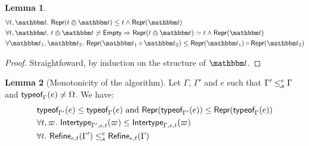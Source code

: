 \documentclass[a4paper]{article}
\theoremstyle{definition}
\newtheorem{lemma}{Lemma}
\begin{document}
  \begin{lemma}
    \begin{align*}
      &\forall t,\ts.\ \tsrep{t\tsand\ts} \leq t \land \tsrep{\ts}\\
      &\forall t,\ts.\ t\tsand\ts \not\simeq \Empty \Rightarrow \tsrep{t\tsand\ts} \simeq t \land \tsrep{\ts}\\
      &\forall \ts_1,\ts_2.\ \tsrep{\apply {\ts_1}{\ts_2}} \leq \apply {\tsrep {\ts_1}}{\tsrep {\ts_2}}
    \end{align*}
  \end{lemma}

  \begin{proof}
    Straightfoward, by induction on the structure of $\ts$.
  \end{proof}

  \begin{lemma}[Monotonicity of the algorithm] Let $\Gamma$, $\Gamma'$ and $e$ such that $\Gamma'\leq_{\!\scriptscriptstyle\mathcal{A}}^e \Gamma$ and $\textsf{typeof}_{\Gamma}(e) \neq \Omega$. We have:
    \begin{align*}
      &\textsf{typeof}_{\Gamma'}(e) \leq \textsf{typeof}_{\Gamma}(e) \text{ and } \textsf{Repr}(\textsf{typeof}_{\Gamma'}(e)) \leq \textsf{Repr}(\textsf{typeof}_{\Gamma}(e))\\
      &\forall t,\varpi.\ \textsf{Intertype}_{\Gamma',e,t} (\varpi) \leq \textsf{Intertype}_{\Gamma,e,t} (\varpi)\\
      &\forall t.\ \textsf{Refine}_{e,t}(\Gamma') \leq_{\!\scriptscriptstyle\mathcal{A}}^e \textsf{Refine}_{e,t}(\Gamma)\\
    \end{align*}
  \end{lemma}
\end{document}
